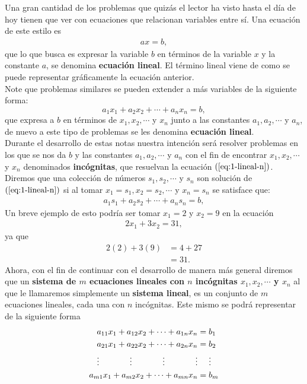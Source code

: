 Una gran cantidad de los problemas que quizás el lector ha visto hasta el día de hoy tienen que ver con ecuaciones que relacionan variables entre sí. Una ecuación de este estilo es
\begin{align*}
  ax=b,
\end{align*}
que lo que busca es expresar la variable $b$ en términos de la variable $x$ y la constante $a$, se denomina \textbf{ecuación lineal}. El término lineal viene de como se puede representar gráficamente la ecuación anterior.\\
Note que problemas similares se pueden extender a más variables de la siguiente forma:
\begin{equation}\label{eq:1-lineal-n}
  a_1x_1+a_2x_2+\cdots+a_nx_n=b,
\end{equation}
que expresa a $b$ en términos de $x_1,x_2,\cdots$ y $x_n$ junto a las constantes $a_1,a_2,\cdots$ y $a_n$, de nuevo a este tipo de problemas se les denomina \textbf{ecuación lineal}.\\
Durante el desarrollo de estas notas nuestra intención será resolver problemas en los que se nos da $b$ y las constantes $a_1,a_2,\cdots$ y $a_n$ con el fin de encontrar $x_1,x_2,\cdots$ y $x_n$ denominados \textbf{incógnitas}, que resuelvan la ecuación $(\ref{eq:1-lineal-n})$.\\
Diremos que una colección de números $s_1,s_2,\cdots$ y $s_n$ son solución de $(\ref{eq:1-lineal-n})$ si al tomar $x_1=s_1,x_2=s_2,\cdots$ y $x_n=s_n$ se satisface que:
\begin{align*}
  a_1s_1+a_2s_2+\cdots+a_ns_n=b,
\end{align*}
Un breve ejemplo de esto podría ser tomar $x_1=2$ y $x_2=9$ en la ecuación
\begin{align*}
  2x_1+3x_2=31,
\end{align*}
ya que
\begin{align*}
  2(2)+3(9)&=4+27\\
  &=31.
\end{align*}
Ahora, con el fin de continuar con el desarrollo de manera más general diremos que un \textbf{sistema de $m$ ecuaciones lineales con $n$ incógnitas $x_1,x_2,\cdots$ y $x_n$} al que le llamaremos simplemente un \textbf{sistema lineal}, es un conjunto de $m$ ecuaciones lineales, cada una con $n$ incógnitas. Este mismo se podrá representar de la siguiente forma
\begin{equation}\label{eq:1-sistema-lineal}
  \begin{split}
    a_{11}x_1+a_{12}x_2+\cdots+a_{1n}x_n&=b_1\\
    a_{21}x_1+a_{22}x_2+\cdots+a_{2n}x_n&=b_2\\
    \vdots \hspace{1.3cm} \vdots \hspace{1.3cm} \vdots \hspace{1.3cm} \vdots &\phantom{=} \hspace{0.2cm}\vdots\\ 
    a_{m1}x_1+a_{m2}x_2+\cdots+a_{mn}x_n&=b_m
  \end{split}
\end{equation}
